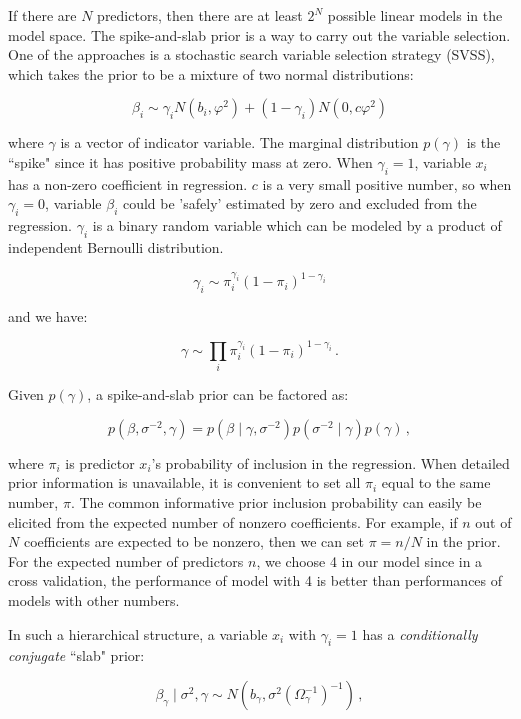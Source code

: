 If there are $N$ predictors, then there are at least $2^N$ possible linear models in the model space. The spike-and-slab prior is a way to carry out the variable selection. One of the approaches is a stochastic search variable selection strategy (SVSS), which takes the prior to be a mixture of two normal distributions:

$$\beta_i \sim \gamma_i N(b_i,\varphi^2)   + (1-\gamma_i) N(0, c \varphi^2)$$

where $\gamma$ is a vector of indicator variable. The marginal distribution $p(\gamma)$ is the ``spike" since it has positive probability mass at zero. When $\gamma_i = 1$, variable $x_i$ has a non-zero coefficient in regression. $c$ is a very small positive number, so when $\gamma_i = 0$, variable $\beta_i$ could be 'safely' estimated by zero and excluded from the regression. $\gamma_i$ is a binary random variable which can be modeled by a product of independent Bernoulli distribution.

$$\gamma_i \sim \pi_{i}^{\gamma_i}(1- \pi_{i})^{1-\gamma_i}$$

and we have:



$$\gamma \sim \prod_{i} \pi_{i}^{\gamma_i}(1- \pi_{i})^{1-\gamma_i} \, .$$


 
Given  $p(\gamma)$, a spike-and-slab prior can be factored as:  


$$ p(\beta, \sigma^{-2},\gamma) = p(\beta \mid \gamma, \sigma^{-2})p(\sigma^{-2} \mid \gamma )p(\gamma)  \,  ,$$


where $\pi_i$ is predictor $x_i$'s probability of inclusion in the regression.  When detailed prior information is unavailable, it is convenient to set all $\pi_i$ equal to the same number, $\pi$. The common informative prior inclusion probability can easily be elicited from the expected number of nonzero coefficients. For example, if $n$ out of $N$ coefficients are expected to be nonzero, then we can set $\pi = n/N$ in the prior. For the expected number of predictors $n$, we choose 4 in our model since in a cross validation, the performance of model with 4 is better than performances of models with other numbers.

In such a hierarchical structure, a variable $x_i$ with $\gamma_i = 1$ has a \textit{conditionally conjugate} ``slab" prior: 


$$ \beta_{\gamma} \mid \sigma^{2} ,\gamma  \sim N(b_{\gamma}, \sigma^{2}(\Omega_{\gamma}^{-1})^{-1}) \,  ,$$


